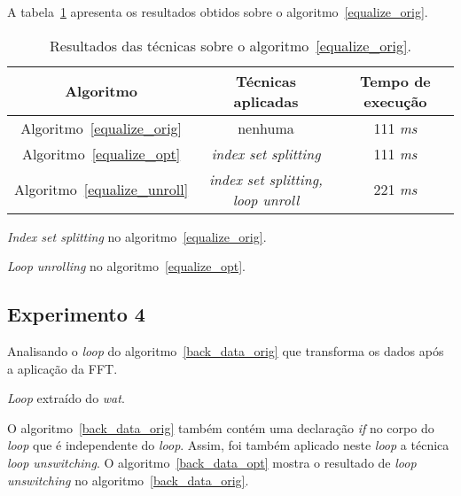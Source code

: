 A tabela~\ref{tabela_equalize} apresenta os resultados obtidos sobre o
algoritmo~\ref{equalize_orig}.

\begin{table}[H]
  \caption{Resultados das técnicas sobre o algoritmo~\ref{equalize_orig}.}
  \label{tabela_equalize}
\begin{center}
  \begin{tabular}{c|c|c}
    Algoritmo & Técnicas aplicadas & Tempo de execução\\
    \hline
    Algoritmo~\ref{equalize_orig} & nenhuma & 111 \textit{ms} \\
    \hline
    Algoritmo~\ref{equalize_opt} & \textit{index set splitting} & 111 \textit{ms} \\
    \hline
    Algoritmo~\ref{equalize_unroll} & \textit{index set splitting, loop unroll} & 221 \textit{ms} \\
    \hline
  \end{tabular}
\end{center}
\end{table}



\begin{algorithm}[H]
  \caption{\textit{Index set splitting} no algoritmo~\ref{equalize_orig}.}
\label{equalize_opt}

\end{algorithm}

\begin{algorithm}[H]
  \caption{\textit{Loop unrolling} no algoritmo~\ref{equalize_opt}.}
\label{equalize_unroll}

\end{algorithm}

\subsection{Experimento 4}

Analisando o \textit{loop} do algoritmo~\ref{back_data_orig} que transforma os 
dados após a aplicação da FFT.

\begin{algorithm}[H]
  \caption{\textit{Loop} extraído do \textit{wat}.}
\label{back_data_orig}

\end{algorithm}

O algoritmo~\ref{back_data_orig} também contém uma declaração \textit{if} no corpo do
\textit{loop} que é independente do \textit{loop}. Assim, foi também
aplicado neste \textit{loop} a técnica \textit{loop unswitching}.
O algoritmo~\ref{back_data_opt} mostra o resultado de \textit{loop unswitching} no
algoritmo~\ref{back_data_orig}.

